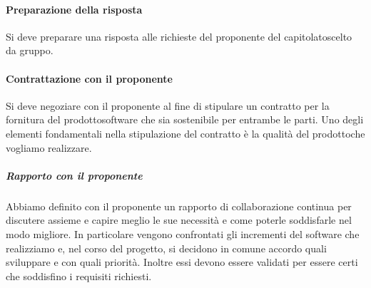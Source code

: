			\paragraph{Preparazione della risposta}
				Si deve preparare una risposta alle richieste del proponente del capitolato\glosp scelto da gruppo.
			\paragraph{Contrattazione con il proponente}
				Si deve negoziare con il proponente al fine di stipulare un contratto per la fornitura del prodotto\glosp software che sia sostenibile per entrambe le parti. Uno degli elementi fondamentali nella stipulazione del contratto è la qualità del prodotto\glosp che vogliamo realizzare.
				\subparagraph*{Rapporto con il proponente}
				Abbiamo definito con il proponente un rapporto di collaborazione continua per discutere assieme e capire meglio le sue necessità e come poterle soddisfarle nel modo migliore.
				In particolare vengono confrontati gli incrementi del software che realizziamo e, nel corso del progetto, si decidono in comune accordo quali sviluppare e con quali priorità. Inoltre essi devono essere validati per essere certi che soddisfino i requisiti richiesti.

